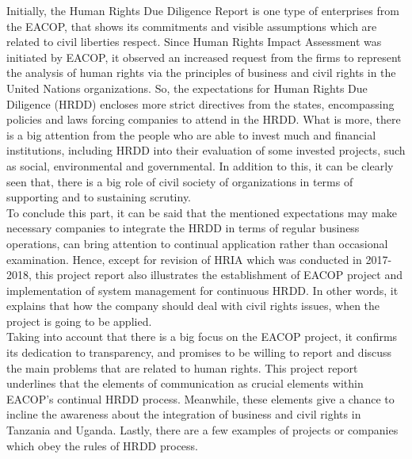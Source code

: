 \documentclass[12pt]{article}
\begin{document}
{\fontsize{12pt}{12pt}\selectfont



\hspace*{1em} Initially, the Human Rights Due Diligence Report is one type of enterprises from the EACOP, that shows its commitments and visible assumptions which are related to civil liberties respect. Since Human Rights Impact Assessment was initiated by EACOP, it observed an increased request from the firms to represent the analysis of human rights via the principles of business and civil rights in the United Nations organizations. So, the expectations for Human Rights Due Diligence (HRDD) encloses more strict directives from the states, encompassing policies and laws forcing companies to attend in the HRDD. What is more, there is a big attention from the people who are able to invest much and financial institutions, including HRDD into their evaluation of some invested projects, such as social, environmental and governmental. In addition to this, it can be clearly seen that, there is a big role of civil society of organizations in terms of supporting and to sustaining scrutiny. 
\\

To conclude this part, it can be said that the mentioned expectations may make necessary companies to integrate the HRDD in terms of regular business operations, can bring attention to continual application rather than occasional examination. Hence, except for revision of HRIA which was conducted in 2017-2018, this project report also illustrates the establishment of EACOP project and implementation of system management for continuous HRDD. In other words, it explains that how the company should deal with civil rights issues, when the project is going to be applied. 
\\

Taking into account that there is a big focus on the EACOP project, it confirms its dedication to transparency, and promises to be willing to report and discuss the main problems that are related to human rights. This project report underlines that the elements of communication as crucial elements within EACOP’s continual HRDD process. Meanwhile, these elements give a chance to incline the awareness about the integration of business and civil rights in Tanzania and Uganda. Lastly, there are a few examples of projects or companies which obey the rules of HRDD process.
\\
\\

}
\end{document}
